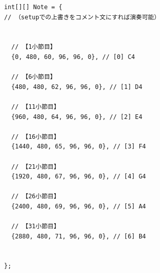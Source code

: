 \begin{lstlisting}[caption={NoteSampler.pde}, label={lst:proc_sampler}]
int[][] Note = {
// （setupでの上書きをコメント文にすれば演奏可能）


  // 【1小節目】
  {0, 480, 60, 96, 96, 0}, // [0] C4

  // 【6小節目】
  {480, 480, 62, 96, 96, 0}, // [1] D4

  // 【11小節目】
  {960, 480, 64, 96, 96, 0}, // [2] E4

  // 【16小節目】
  {1440, 480, 65, 96, 96, 0}, // [3] F4

  // 【21小節目】
  {1920, 480, 67, 96, 96, 0}, // [4] G4

  // 【26小節目】
  {2400, 480, 69, 96, 96, 0}, // [5] A4

  // 【31小節目】
  {2880, 480, 71, 96, 96, 0}, // [6] B4


};
\end{lstlisting}

